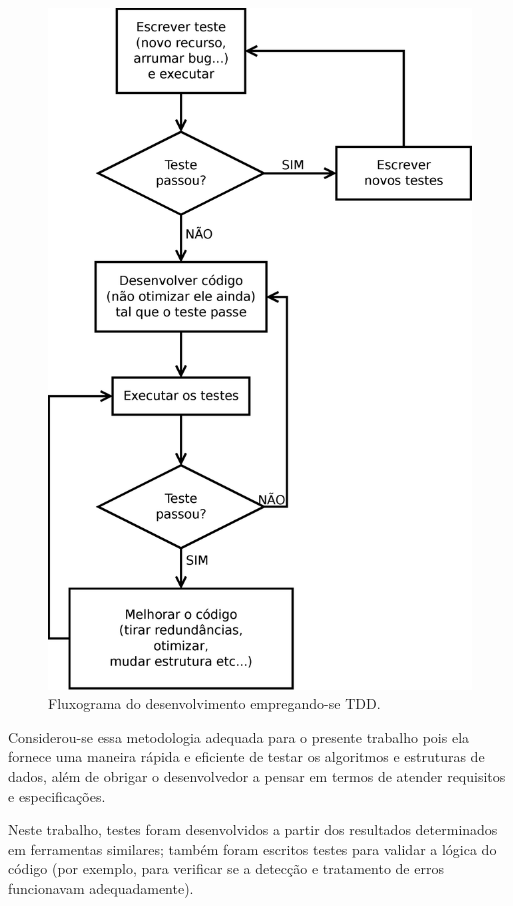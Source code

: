 \begin{figure}[H]
  \centering
  \includegraphics[scale=0.55]{images/diagrams/TDD_diagram}
  \caption{Fluxograma do desenvolvimento empregando-se TDD.}
  \label{fig:tdd_flow}
\end{figure}

Considerou-se essa metodologia adequada para o presente trabalho pois ela fornece uma maneira rápida e eficiente de testar os algoritmos e estruturas de dados, além de obrigar o desenvolvedor a pensar em termos de atender requisitos e especificações.

Neste trabalho, testes foram desenvolvidos a partir dos resultados determinados em ferramentas similares; também foram escritos testes para validar a lógica do código (por exemplo, para verificar se a detecção e tratamento de erros funcionavam adequadamente).


